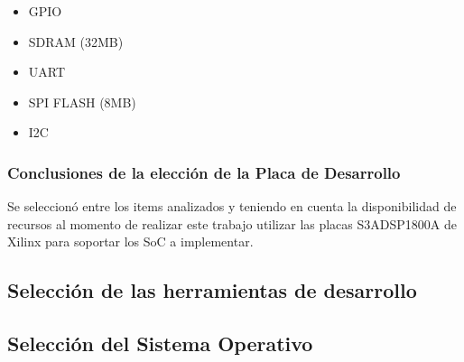 				\begin{itemize}
				  	\item GPIO
					\item SDRAM (32MB)
					\item UART
					\item SPI FLASH (8MB)
					\item I2C
				\end{itemize}				
				
 				\subsubsection{Conclusiones de la elección de la Placa de Desarrollo}
 				Se seleccionó entre los items analizados y teniendo en cuenta la disponibilidad de recursos al momento de realizar este trabajo utilizar las
 				placas S3ADSP1800A de Xilinx para soportar los SoC a implementar.
 			
 			\subsection{Selección de las herramientas de desarrollo} 	 
 		
 		
 			\subsection{Selección del Sistema Operativo}
 			